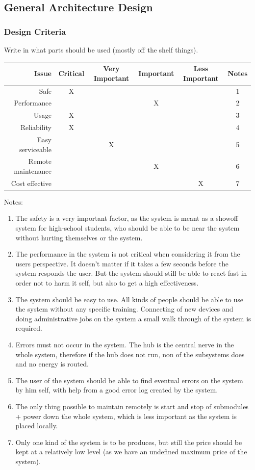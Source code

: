 \subsection{General Architecture Design}
	\subsubsection{Design Criteria}
		Write in what parts should be used (mostly off the shelf things).
				\begin{table}[H]
					\begin{tabular}{| r | c | c | c | c | c |}
					\hline
					Issue & Critical & Very Important & Important & Less Important & Notes \\ \hline
					Safe					& X & ~ & ~ & ~ & 1 \\ \hline
					Performance 			& ~ & ~ & X & ~ & 2 \\ \hline
					Usage 				& X & ~ & ~ & ~ & 3 \\ \hline
					Reliability 			& X & ~ & ~ & ~ & 4 \\ \hline
					Easy serviceable 		& ~ & X & ~ & ~ & 5 \\ \hline
					Remote maintenance 	& ~ & ~ & X & ~ & 6 \\ \hline
					Cost effective 			& ~ & ~ & ~ & X & 7 \\ \hline
					\end{tabular}
				\end{table}
			Notes:
			\begin{enumerate}
			\item The safety is a very important factor, as the system is meant as a showoff system for high-school students, who should
			be able to be near the system without hurting themselves or the system.
			\item The performance in the system is not critical when considering it from the users perspective. It doesn't matter if it takes a few seconds before the system responds the user.
			But the system should still be able to react fast in order not to harm it self, but also to get a high effectiveness. 
			\item The system should be easy to use. All kinds of people should be able to use the system without any specific training.
			Connecting of new devices and doing administrative jobs on the system a small walk through of the system is required. 
			\item Errors must not occur in the system. The hub is the central nerve in the whole system, therefore if the hub does not run, non of the subsystems does and no energy is routed.
			\item The user of the system should be able to find eventual errors on the system by him self, with help from a good error log created by the system.
			\item The only thing possible to maintain remotely is start and stop of submodules + power down the whole system, which is less important as the system is placed locally.
			\item Only one kind of the system is to be produces, but still the price should be kept at a relatively low level (as we have an undefined maximum price of the system).
			\end{enumerate}
